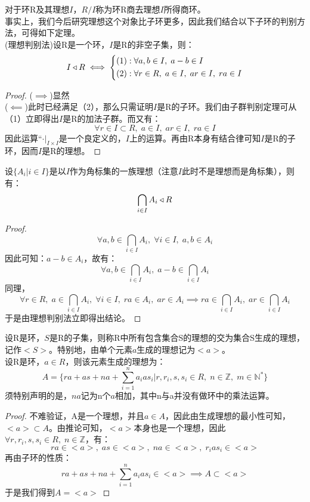 对于环R及其理想$I$，$R/I$称为环R商去理想$I$所得商环。\\
\indent 事实上，我们今后研究理想这个对象比子环更多，因此我们结合以下子环的判别方法，可得如下定理。\\
(理想判别法)设R是一个环，$I$是R的非空子集，则：
\[
I\triangleleft R\iff \left\{
\begin{aligned}
&(1):\forall a,b\in I,\; a-b\in I\\
&(2):\forall r\in R ,\; a\in I,\; ar\in I,\; ra\in I
\end{aligned}\right.
\]
\begin{proof}
($\implies$)显然\\
($\impliedby$)此时已经满足（2），那么只需证明$I$是R的子环。我们由子群判别定理可从（1）立即得出$I$是R的加法子群。而又有：
\[
\forall r\in I\subset R ,\; a\in I,\; ar\in I,\; ra\in I
\]
因此运算“$\cdot|_{I\times I}$是一个良定义的，$I$上的运算。再由R本身有结合律可知$I$是R的子环，因而$I$是R的理想。
\end{proof}
设$\{A_i|i\in I\}$是以$I$作为角标集的一族理想（注意$I$此时不是理想而是角标集），则有：
\[
\bigcap_{i\in I}A_i\triangleleft R
\]
\begin{proof}
\[
\forall a,b\in \bigcap_{i\in I}A_i,\; \forall i\in I,\; a,b\in A_i
\]
因此可知：$a-b\in A_i$，故有：
\[
\forall a,b\in \bigcap_{i\in I}A_i,\; a-b\in \bigcap_{i\in I}A_i
\]
同理，
\[
\forall r\in R,\; a\in \bigcap_{i\in I}A_i,\; \forall i\in I,\; ra\in A_i,\; ar\in A_i\implies ra\in \bigcap_{i\in I}A_i,\; ar\in \bigcap_{i\in I}A_i
\]
于是由理想判别法立即得出结论。
\end{proof}
设R是环，$S$是R的子集，则称R中所有包含集合S的理想的交为集合S生成的理想，记作$<S>$。特别地，由单个元素$a$生成的理想记为$<a>$。\\
设R是环，$a\in R$，则该元素生成的理想为：
\[
A=\{ra+as+na+\sum_{i=1}^{n}a_ias_i|r,r_i,s,s_i\in R,\; n\in \mathbb{Z},\; m\in \mathbb{N}^*\}
\]
须特别声明的是，$na$记为n个$a$相加，其中n与a并没有做环中的乘法运算。\\
\begin{proof}
不难验证，A是一个理想，并且$a\in A$，因此由生成理想的最小性可知，$<a>\subset A$。由推论可知，$<a>$本身也是一个理想，因此$\forall r,r_i,s,s_i\in R,\; n\in \mathbb{Z}$，有：
\[
ra\in <a>,\; as\in <a>,\; na\in <a>,\; r_ias_i\in <a>
\]
再由子环的性质：
\[
ra+as+na+\sum_{i=1}^{n}a_ias_i\in <a>\implies A\subset <a>
\]
于是我们得到$A=<a>$
\end{proof}
\\

